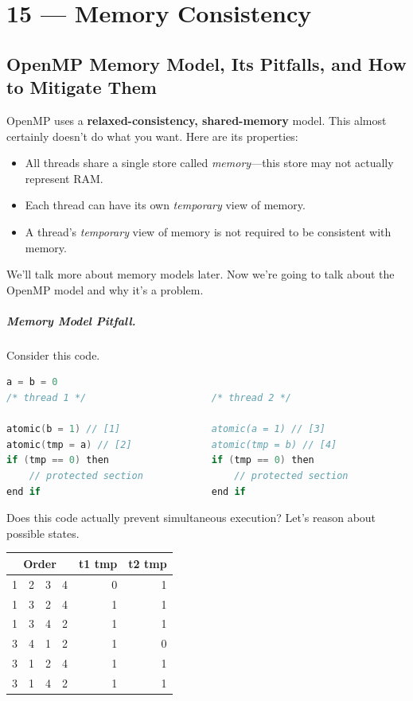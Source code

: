 \documentclass[a4paper]{report}
\begin{document}
\chapter*{15 --- Memory Consistency}


\section*{OpenMP Memory Model, Its Pitfalls, and How to Mitigate Them}
OpenMP uses a {\bf relaxed-consistency, shared-memory} model. This almost certainly doesn't 
do what you want. Here are its properties:

\begin{itemize}
    \item All threads share a single store called
      \emph{memory}---this store may not actually represent RAM.
    \item Each thread can have its own {\it temporary} view of memory.
    \item A thread's {\it temporary} view of memory is not required to be
      consistent with memory.
\end{itemize}

We'll talk more about memory models later. Now we're going to talk about 
the OpenMP model and why it's a problem.

\paragraph{Memory Model Pitfall.} Consider this code.

  \begin{lstlisting}[language=C]
                    a = b = 0
/* thread 1 */                      /* thread 2 */

atomic(b = 1) // [1]                atomic(a = 1) // [3]
atomic(tmp = a) // [2]              atomic(tmp = b) // [4]
if (tmp == 0) then                  if (tmp == 0) then
    // protected section                // protected section
end if                              end if
  \end{lstlisting}

Does this code actually prevent simultaneous execution?
Let's reason about possible states.

  \begin{center}
  \begin{tabular}{r r r r | r r}
    \multicolumn{4}{c|}{Order} & t1 tmp & t2 tmp\\
    \hline
    1 & 2 & 3 & 4 & 0 & 1\\
    1 & 3 & 2 & 4 & 1 & 1\\
    1 & 3 & 4 & 2 & 1 & 1\\
    3 & 4 & 1 & 2 & 1 & 0\\
    3 & 1 & 2 & 4 & 1 & 1\\
    3 & 1 & 4 & 2 & 1 & 1\\
  \end{tabular}
  \end{center}
\end{document}
